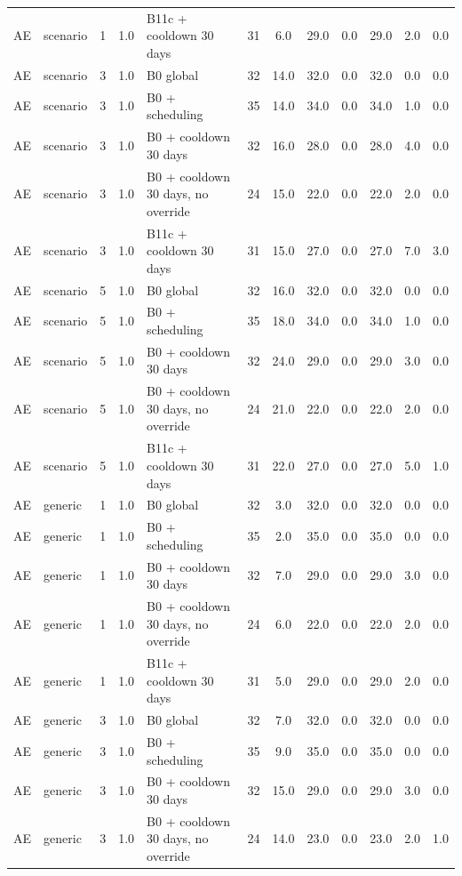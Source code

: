 \documentclass[10pt,onecolumn,letterpaper]{article}
\begin{document}
\begin{longtable}{lllllccccccc}
AE & scenario & 1 & 1.0 & B11c + cooldown 30 days & 31 & 6.0 & 29.0 & 0.0 & 29.0 & 2.0 & 0.0 \\
AE & scenario & 3 & 1.0 & B0 global & 32 & 14.0 & 32.0 & 0.0 & 32.0 & 0.0 & 0.0 \\
AE & scenario & 3 & 1.0 & B0 + scheduling & 35 & 14.0 & 34.0 & 0.0 & 34.0 & 1.0 & 0.0 \\
AE & scenario & 3 & 1.0 & B0 + cooldown 30 days & 32 & 16.0 & 28.0 & 0.0 & 28.0 & 4.0 & 0.0 \\
AE & scenario & 3 & 1.0 & B0 + cooldown 30 days, no override & 24 & 15.0 & 22.0 & 0.0 & 22.0 & 2.0 & 0.0 \\
AE & scenario & 3 & 1.0 & B11c + cooldown 30 days & 31 & 15.0 & 27.0 & 0.0 & 27.0 & 7.0 & 3.0 \\
AE & scenario & 5 & 1.0 & B0 global & 32 & 16.0 & 32.0 & 0.0 & 32.0 & 0.0 & 0.0 \\
AE & scenario & 5 & 1.0 & B0 + scheduling & 35 & 18.0 & 34.0 & 0.0 & 34.0 & 1.0 & 0.0 \\
AE & scenario & 5 & 1.0 & B0 + cooldown 30 days & 32 & 24.0 & 29.0 & 0.0 & 29.0 & 3.0 & 0.0 \\
AE & scenario & 5 & 1.0 & B0 + cooldown 30 days, no override & 24 & 21.0 & 22.0 & 0.0 & 22.0 & 2.0 & 0.0 \\
AE & scenario & 5 & 1.0 & B11c + cooldown 30 days & 31 & 22.0 & 27.0 & 0.0 & 27.0 & 5.0 & 1.0 \\
AE & generic & 1 & 1.0 & B0 global & 32 & 3.0 & 32.0 & 0.0 & 32.0 & 0.0 & 0.0 \\
AE & generic & 1 & 1.0 & B0 + scheduling & 35 & 2.0 & 35.0 & 0.0 & 35.0 & 0.0 & 0.0 \\
AE & generic & 1 & 1.0 & B0 + cooldown 30 days & 32 & 7.0 & 29.0 & 0.0 & 29.0 & 3.0 & 0.0 \\
AE & generic & 1 & 1.0 & B0 + cooldown 30 days, no override & 24 & 6.0 & 22.0 & 0.0 & 22.0 & 2.0 & 0.0 \\
AE & generic & 1 & 1.0 & B11c + cooldown 30 days & 31 & 5.0 & 29.0 & 0.0 & 29.0 & 2.0 & 0.0 \\
AE & generic & 3 & 1.0 & B0 global & 32 & 7.0 & 32.0 & 0.0 & 32.0 & 0.0 & 0.0 \\
AE & generic & 3 & 1.0 & B0 + scheduling & 35 & 9.0 & 35.0 & 0.0 & 35.0 & 0.0 & 0.0 \\
AE & generic & 3 & 1.0 & B0 + cooldown 30 days & 32 & 15.0 & 29.0 & 0.0 & 29.0 & 3.0 & 0.0 \\
AE & generic & 3 & 1.0 & B0 + cooldown 30 days, no override & 24 & 14.0 & 23.0 & 0.0 & 23.0 & 2.0 & 1.0 \\

\end{longtable}
\end{document}
